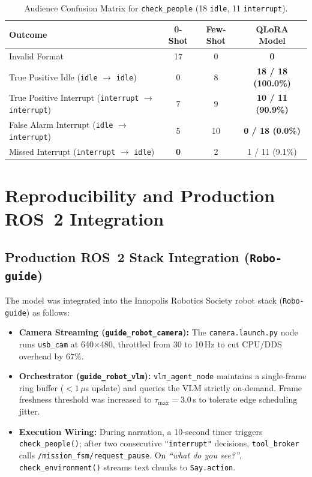 ﻿\documentclass[11pt,a4paper]{article}
\begin{document}
\begin{table}[htbp]
\centering
\small
\caption{Audience Confusion Matrix for \texttt{check\_people} (18 \texttt{idle}, 11 \texttt{interrupt}).}
\label{tab:qlora_confusion}
\begin{tabular*}{\textwidth}{@{\extracolsep{\fill}}lccc@{}}
\toprule
\textbf{Outcome} & \textbf{0-Shot} & \textbf{Few-Shot} & \textbf{QLoRA Model} \\
\midrule
Invalid Format & 17 & 0 & \textbf{0} \\
True Positive Idle (\texttt{idle} $\to$ \texttt{idle}) & 0 & 8 & \textbf{18 / 18 (100.0\%)} \\
True Positive Interrupt (\texttt{interrupt} $\to$ \texttt{interrupt}) & 7 & 9 & \textbf{10 / 11 (90.9\%)} \\
False Alarm Interrupt (\texttt{idle} $\to$ \texttt{interrupt}) & 5 & 10 & \textbf{0 / 18 (0.0\%)} \\
Missed Interrupt (\texttt{interrupt} $\to$ \texttt{idle}) & \textbf{0} & 2 & 1 / 11 (9.1\%) \\
\bottomrule
\end{tabular*}
\end{table}

\section{Reproducibility and Production ROS~2 Integration}

\subsection{Production ROS~2 Stack Integration (\texttt{Robo-guide})}
The model was integrated into the Innopolis Robotics Society robot stack (\texttt{Robo-guide}) as follows:
\begin{itemize}
    \item \textbf{Camera Streaming (\texttt{guide\_robot\_camera}):} The \texttt{camera.launch.py} node runs \texttt{usb\_cam} at 640$\times$480, throttled from 30 to 10\,Hz to cut CPU/DDS overhead by $67\%$.
    \item \textbf{Orchestrator (\texttt{guide\_robot\_vlm}):} \texttt{vlm\_agent_node} maintains a single-frame ring buffer ($< 1\,\mu$s update) and queries the VLM strictly on-demand. Frame freshness threshold was increased to $\tau_{\text{max}} = 3.0$\,s to tolerate edge scheduling jitter.
    \item \textbf{Execution Wiring:} During narration, a 10-second timer triggers \texttt{check\_people()}; after two consecutive \texttt{"interrupt"} decisions, \texttt{tool\_broker} calls \texttt{/mission\_fsm/request\_pause}. On \textit{``what do you see?''}, \texttt{check\_environment()} streams text chunks to \texttt{Say.action}.
\end{itemize}
\end{document}
